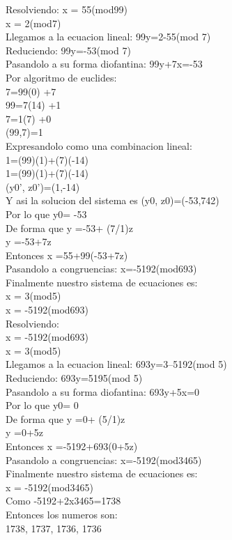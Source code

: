 Resolviendo: 
x = 55(mod99)\\
x = 2(mod7)\\
Llegamos a la ecuacion lineal: 99y=2-55(mod 7) \\
Reduciendo: 99y=-53(mod 7)\\
Pasandolo a su forma diofantina: 99y+7x=-53\\
Por algoritmo de euclides: \\
7=99(0)  +7\\
99=7(14)  +1\\
7=1(7)  +0\\
(99,7)=1\\
Expresandolo como una combinacion lineal: \\
1=(99)(1)+(7)(-14)\\
1=(99)(1)+(7)(-14)\\
(y0', z0')=(1,-14)\\
Y asi la solucion del sistema es (y0, z0)=(-53,742)\\
Por lo que y0= -53\\
De forma que y =-53+ (7/1)z\\
y =-53+7z\\
Entonces x =55+99(-53+7z)\\
Pasandolo a congruencias: x=-5192(mod693)\\
Finalmente nuestro sistema de ecuaciones es:\\
x = 3(mod5)\\
x = -5192(mod693)\\


Resolviendo: \\
x = -5192(mod693)\\
x = 3(mod5)\\
Llegamos a la ecuacion lineal: 693y=3--5192(mod 5)\\
Reduciendo: 693y=5195(mod 5)\\
Pasandolo a su forma diofantina: 693y+5x=0\\
Por lo que y0= 0\\
De forma que y =0+ (5/1)z\\
y =0+5z\\
Entonces x =-5192+693(0+5z)\\
Pasandolo a congruencias: x=-5192(mod3465)\\
Finalmente nuestro sistema de ecuaciones es:\\
x = -5192(mod3465) \\
Como -5192+2x3465=1738\\
Entonces los numeros son: \\
1738, 1737, 1736, 1736